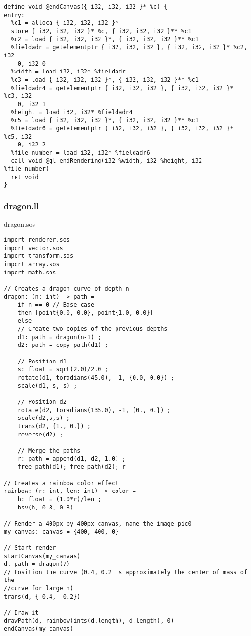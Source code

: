 \documentclass[main.tex]{subfiles}
\begin{document}
{\begin{lstlisting}
define void @endCanvas({ i32, i32, i32 }* %c) {
entry:
  %c1 = alloca { i32, i32, i32 }*
  store { i32, i32, i32 }* %c, { i32, i32, i32 }** %c1
  %c2 = load { i32, i32, i32 }*, { i32, i32, i32 }** %c1
  %fieldadr = getelementptr { i32, i32, i32 }, { i32, i32, i32 }* %c2, i32 
    0, i32 0
  %width = load i32, i32* %fieldadr
  %c3 = load { i32, i32, i32 }*, { i32, i32, i32 }** %c1
  %fieldadr4 = getelementptr { i32, i32, i32 }, { i32, i32, i32 }* %c3, i32 
    0, i32 1
  %height = load i32, i32* %fieldadr4
  %c5 = load { i32, i32, i32 }*, { i32, i32, i32 }** %c1
  %fieldadr6 = getelementptr { i32, i32, i32 }, { i32, i32, i32 }* %c5, i32 
    0, i32 2
  %file_number = load i32, i32* %fieldadr6
  call void @gl_endRendering(i32 %width, i32 %height, i32 %file_number)
  ret void
}
\end{lstlisting}}

\subsubsection{dragon.ll}
\colorbox{blue!30}{dragon.sos}
	\begin{lstlisting}
import renderer.sos
import vector.sos
import transform.sos
import array.sos
import math.sos

// Creates a dragon curve of depth n
dragon: (n: int) -> path =
    if n == 0 // Base case
    then [point{0.0, 0.0}, point{1.0, 0.0}]
    else
    // Create two copies of the previous depths
    d1: path = dragon(n-1) ;
    d2: path = copy_path(d1) ;

    // Position d1
    s: float = sqrt(2.0)/2.0 ;
    rotate(d1, toradians(45.0), -1, {0.0, 0.0}) ;
    scale(d1, s, s) ;

    // Position d2
    rotate(d2, toradians(135.0), -1, {0., 0.}) ;
    scale(d2,s,s) ;
    trans(d2, {1., 0.}) ;
    reverse(d2) ;

    // Merge the paths
    r: path = append(d1, d2, 1.0) ;
    free_path(d1); free_path(d2); r

// Creates a rainbow color effect
rainbow: (r: int, len: int) -> color =
    h: float = (1.0*r)/len ;
    hsv(h, 0.8, 0.8)

// Render a 400px by 400px canvas, name the image pic0
my_canvas: canvas = {400, 400, 0}

// Start render
startCanvas(my_canvas)
d: path = dragon(7)
// Position the curve (0.4, 0.2 is approximately the center of mass of the 
//curve for large n)
trans(d, {-0.4, -0.2})

// Draw it
drawPath(d, rainbow(ints(d.length), d.length), 0)
endCanvas(my_canvas)
\end{lstlisting}
\end{document}
